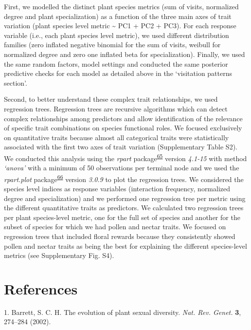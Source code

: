 \documentclass[12pt,a4paper,]{article}
\begin{document}
First, we modelled the distinct plant species metrics (sum of visits,
normalized degree and plant specialization) as a function of the three
main axes of trait variation (plant species level metric
\textasciitilde{} PC1 + PC2 + PC3). For each response variable (i.e.,
each plant species level metric), we used different distribution
families (zero inflated negative binomial for the sum of visits, weibull
for normalized degree and zero one inflated beta for specialization).
Finally, we used the same random factors, model settings and conducted
the same posterior predictive checks for each model as detailed above in
the `visitation patterns section'.

Second, to better understand these complex trait relationships, we used
regression trees. Regression trees are recursive algorithms which can
detect complex relationships among predictors and allow identification
of the relevance of specific trait combinations on species functional
roles. We focused exclusively on quantitative traits because almost all
categorical traits were statistically associated with the first two axes
of trait variation (Supplementary Table S2). We conducted this analysis
using the \emph{rpart}
package\textsuperscript{\protect\hyperlink{ref-therneau2015}{65}}
version \emph{4.1-15} with method \emph{`anova'} with a minimum of 50
observations per terminal node and we used the \emph{rpart.plot}
package\textsuperscript{\protect\hyperlink{ref-milborrow2015}{66}}
version \emph{3.0.9} to plot the regression trees. We considered the
species level indices as response variables (interaction frequency,
normalized degree and specialization) and we performed one regression
tree per metric using the different quantitative traits as predictors.
We calculated two regression trees per plant species-level metric, one
for the full set of species and another for the subset of species for
which we had pollen and nectar traits. We focused on regression trees
that included floral rewards because they consistently showed pollen and
nectar traits as being the best for explaining the different
species-level metrics (see Supplementary Fig. S4).

\section{References}\label{references}

\hypertarget{refs}{}
\hypertarget{ref-barrett2002}{}
1. Barrett, S. C. H. The evolution of plant sexual diversity. \emph{Nat.
Rev. Genet.} \textbf{3}, 274--284 (2002).
\end{document}
